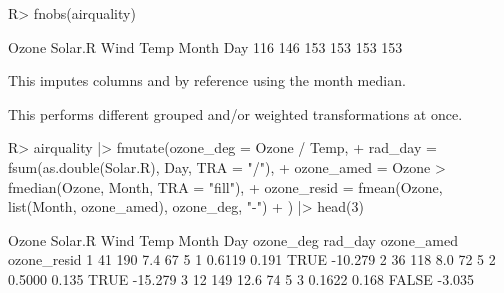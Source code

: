 \documentclass[article]{jss}
\begin{document}
%
\begin{Schunk}
\begin{Sinput}
R> fnobs(airquality)
\end{Sinput}
\begin{Soutput}
  Ozone Solar.R    Wind    Temp   Month     Day 
    116     146     153     153     153     153 
\end{Soutput}
\end{Schunk}
This imputes columns  and  by reference using the month median.
\begin{Schunk}
\end{Schunk}
This performs different grouped and/or weighted transformations at once.
\begin{Schunk}
\begin{Sinput}
R> airquality |> fmutate(ozone_deg = Ozone / Temp,
+    rad_day = fsum(as.double(Solar.R), Day, TRA = "/"),
+    ozone_amed = Ozone > fmedian(Ozone, Month, TRA = "fill"),
+    ozone_resid = fmean(Ozone, list(Month, ozone_amed), ozone_deg, "-")
+    ) |> head(3)
\end{Sinput}
\begin{Soutput}
  Ozone Solar.R Wind Temp Month Day ozone_deg rad_day ozone_amed ozone_resid
1    41     190  7.4   67     5   1    0.6119   0.191       TRUE     -10.279
2    36     118  8.0   72     5   2    0.5000   0.135       TRUE     -15.279
3    12     149 12.6   74     5   3    0.1622   0.168      FALSE      -3.035
\end{Soutput}
\end{Schunk}
%
\end{document}

